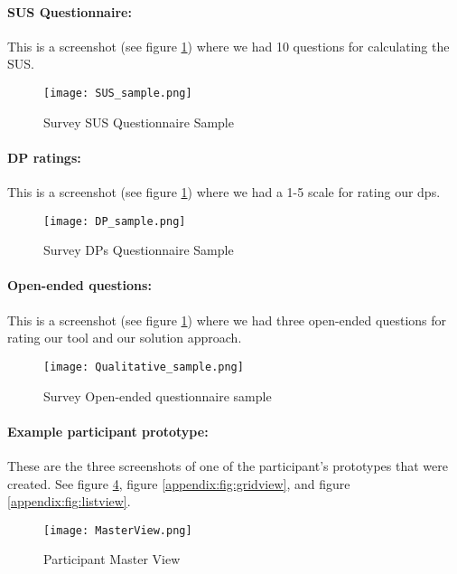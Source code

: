 \paragraph{SUS Questionnaire:} This is a screenshot (see figure \ref{appendix:fig:sus_sample}) where we had 10 questions for calculating the SUS. 
\begin{figure}[ht]
    \centering
    \texttt{[image: SUS\_sample.png]}
    \caption[SUS Questionnaire]{Survey SUS Questionnaire Sample}
    \label{appendix:fig:sus_sample}
\end{figure}

\paragraph{DP ratings:} This is a screenshot (see figure \ref{appendix:fig:sus_sample}) where we had a 1-5 scale for rating our \ac{dp}s. 
\begin{figure}[ht]
    \centering
    \texttt{[image: DP\_sample.png]}
    \caption[DPs Questionnaire]{Survey DPs Questionnaire Sample}
    \label{appendix:fig:dps_sample}
\end{figure}

\paragraph{Open-ended questions:} This is a screenshot (see figure \ref{appendix:fig:sus_sample}) where we had three open-ended questions for rating our tool and our solution approach. 
\begin{figure}[ht]
    \centering
    \texttt{[image: Qualitative\_sample.png]}
    \caption[Open-Ended Questionnaire]{Survey Open-ended questionnaire sample}
    \label{appendix:fig:qualitative_sample}
\end{figure}

\paragraph{Example participant prototype:} These are the three screenshots of one of the participant's prototypes that were created. See figure \ref{appendix:fig:masterview}, figure \ref{appendix:fig:gridview}, and figure \ref{appendix:fig:listview}.
\begin{figure}[ht]
    \centering
    \texttt{[image: MasterView.png]}
    \caption[Example Prototype]{Participant Master View}
    \label{appendix:fig:masterview}
\end{figure}

